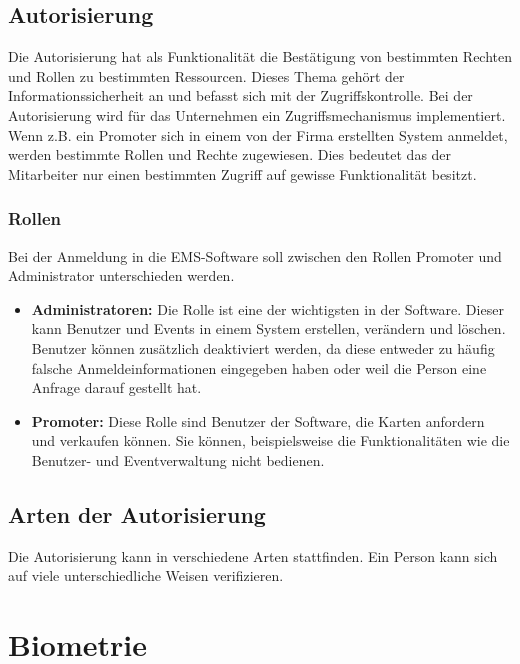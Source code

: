 \subsection{Autorisierung}
Die Autorisierung hat als Funktionalität die Bestätigung von bestimmten Rechten und Rollen zu bestimmten Ressourcen. Dieses Thema gehört der Informationssicherheit an und befasst sich mit der Zugriffskontrolle. Bei der Autorisierung wird für das Unternehmen ein Zugriffsmechanismus implementiert. Wenn z.B. ein Promoter sich in einem von der Firma erstellten System anmeldet, werden bestimmte Rollen und Rechte zugewiesen. Dies bedeutet das der Mitarbeiter nur einen bestimmten Zugriff auf gewisse Funktionalität besitzt.

\subsubsection{Rollen}
Bei der Anmeldung in die EMS-Software soll zwischen den Rollen Promoter und Administrator unterschieden werden. 
\begin{itemize}
	\item \textbf{Administratoren:} Die Rolle ist eine der wichtigsten in der Software. Dieser kann Benutzer und Events in einem System erstellen, verändern und löschen. Benutzer können zusätzlich deaktiviert werden, da diese entweder zu häufig falsche Anmeldeinformationen eingegeben haben oder weil die Person eine Anfrage darauf gestellt hat.
	\item \textbf{Promoter:} Diese Rolle sind Benutzer der Software, die Karten anfordern und verkaufen können. Sie können, beispielsweise die Funktionalitäten wie die Benutzer- und Eventverwaltung nicht bedienen.
\end{itemize}

\subsection{Arten der Autorisierung}
Die Autorisierung kann in verschiedene Arten stattfinden. Ein Person kann sich auf viele unterschiedliche Weisen verifizieren.

\subsubsection{}


\section{Biometrie}


